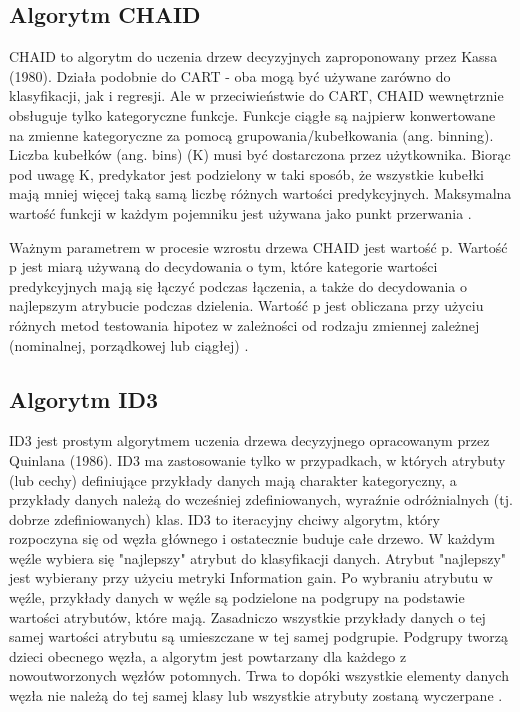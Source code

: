\documentclass[10pt,a4paper]{article}
\begin{document}
\subsection{Algorytm CHAID}
CHAID to algorytm do uczenia drzew decyzyjnych zaproponowany przez Kassa (1980). Działa podobnie do CART - oba mogą być używane zarówno do klasyfikacji, jak i regresji. Ale w przeciwieństwie do CART, CHAID wewnętrznie obsługuje tylko kategoryczne funkcje. Funkcje ciągłe są najpierw konwertowane na zmienne kategoryczne za pomocą grupowania/kubełkowania (ang. binning). Liczba kubełków (ang. bins) (K) musi być dostarczona przez użytkownika. Biorąc pod uwagę K, predykator jest podzielony w taki sposób, że wszystkie kubełki mają mniej więcej taką samą liczbę różnych wartości predykcyjnych. Maksymalna wartość funkcji w każdym pojemniku jest używana jako punkt przerwania \cite{MazumdarWWW, Kass1980}.\par
\vskip 0.2in
Ważnym parametrem w procesie wzrostu drzewa CHAID jest wartość p. Wartość p jest miarą używaną do decydowania o tym, które kategorie wartości predykcyjnych mają się łączyć podczas łączenia, a także do decydowania o najlepszym atrybucie podczas dzielenia. Wartość p jest obliczana przy użyciu różnych metod testowania hipotez w zależności od rodzaju zmiennej zależnej (nominalnej, porządkowej lub ciągłej) \cite{MazumdarWWW}.

\subsection{Algorytm ID3}
ID3 jest prostym algorytmem uczenia drzewa decyzyjnego opracowanym przez Quinlana (1986). ID3 ma zastosowanie tylko w przypadkach, w których atrybuty (lub cechy) definiujące przykłady danych mają charakter kategoryczny, a przykłady danych należą do wcześniej zdefiniowanych, wyraźnie odróżnialnych (tj. dobrze zdefiniowanych) klas. ID3 to iteracyjny chciwy algorytm, który rozpoczyna się od węzła głównego i ostatecznie buduje całe drzewo. W każdym węźle wybiera się "najlepszy" atrybut do klasyfikacji danych. Atrybut "najlepszy" jest wybierany przy użyciu metryki Information gain. Po wybraniu atrybutu w węźle, przykłady danych w węźle są podzielone na podgrupy na podstawie wartości atrybutów, które mają. Zasadniczo wszystkie przykłady danych o tej samej wartości atrybutu są umieszczane w tej samej podgrupie. Podgrupy tworzą dzieci obecnego węzła, a algorytm jest powtarzany dla każdego z nowoutworzonych węzłów potomnych. Trwa to dopóki wszystkie elementy danych węzła nie należą do tej samej klasy lub wszystkie atrybuty zostaną wyczerpane \cite{MazumdarWWW, Quinlan1986}.
\end{document}
